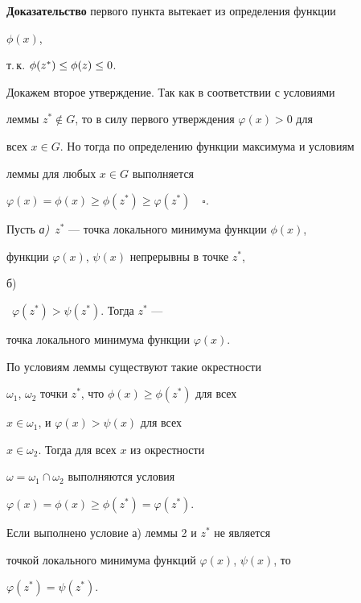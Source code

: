  


{\bf Доказательство} первого пункта вытекает из определения функции 


$\phi(x)$, 


т.\,к.{} $\phi(z^*)\le\linebreak \phi(z)\le 0$. 


 


Докажем второе утверждение. Так как в соответствии с условиями 


леммы $z^*\notin G$, то в силу первого утверждения $\varphi(x)>0$ для 


всех $x\in G$. Но тогда по определению функции максимума и условиям 


леммы для любых $x\in G$ выполняется 


$\varphi(x)=\phi(x)\ge\phi(z^*)\ge\varphi(z^*)\quad\square$. 


 


\begin{lem} 


Пусть {\em а)}~$z^*$ --- точка локального минимума функции $\phi(x)$, 


функции $\varphi(x)$, $\psi(x)$ непрерывны в точке $z^*$, {\em 


б)}~$\varphi(z^*)>\psi(z^*)$. Тогда $z^*$ --- 


точка локального минимума функции $\varphi(x)$. 


\end{lem} 


 


\begin{pf} По условиям леммы существуют такие окрестности 


$\omega_1$, $\omega_2$ точки $z^*$, что $\phi(x)\ge\phi(z^*)$ для всех 


$x\in\omega_1$, и $\varphi(x)>\psi(x)$ для всех 


$x\in \omega_2$. Тогда для всех $x$ из окрестности 


$\omega=\omega_1\cap\omega_2$ выполняются условия 


$\varphi(x)=\phi(x)\ge\phi(z^*)=\varphi(z^*)$. 


\end{pf} 


 


\begin{cornonum} 


Если выполнено условие а) леммы 2 и $z^*$ не является 


точкой локального минимума функций $\varphi(x)$, $\psi(x)$, то 


$\varphi(z^*)=\psi(z^*)$. 


\end{cornonum} 


